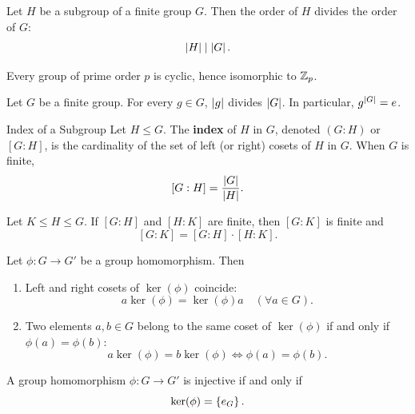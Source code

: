 \documentclass[12pt,a4paper]{article}
\begin{document}
    \begin{thm}
        Let $H$ be a subgroup of a finite group $G$. Then the order of $H$ divides the order of $G$:
        \[
            \left\lvert H \right\rvert \mid \left\lvert G \right\rvert.
        \]
    \end{thm}
    
    \begin{cor}\label{0.3.5}
        Every group of prime order $p$ is cyclic, hence isomorphic to $\mathbb{Z}_p$.
    \end{cor}
    \bigskip

    \begin{thm}
        Let $G$ be a finite group. For every $g \in G$, $\left\lvert g \right\rvert$ divides $\left\lvert G \right\rvert$. In particular, $g^{\left\lvert G \right\rvert} = e$.
    \end{thm}
    \bigskip

    \begin{defi}{Index of a Subgroup}
        Let $H \le G$. The \textbf{index} of $H$ in $G$, denoted $(G : H)$ or $[G : H]$, is the cardinality of the set of left (or right) cosets of $H$ in $G$. When $G$ is finite,
        \[
            [G : H] = \frac{\left\lvert G \right\rvert}{\left\lvert H \right\rvert}.
        \]
    \end{defi}
    \bigskip

    \begin{thm}
        Let $K \le H \le G$. If $[G : H]$ and $[H : K]$ are finite, then $[G : K]$ is finite and
        \[
            [G : K] = [G : H] \cdot [H : K].
        \]
    \end{thm}
    \bigskip

    \begin{thm}
        Let $\phi \colon G \to G'$ be a group homomorphism. Then
        \begin{enumerate}
            \item Left and right cosets of $\ker(\phi)$ coincide:
            \[
                a \ker(\phi) = \ker(\phi) a \quad (\forall a \in G).
            \]
            \item Two elements $a, b \in G$ belong to the same coset of $\ker(\phi)$ if and only if $\phi(a) = \phi(b)$:
            \[
                a \ker(\phi) = b \ker(\phi) \iff \phi(a) = \phi(b).
            \]
        \end{enumerate}
    \end{thm}
    \bigskip

    \begin{cor}
        A group homomorphism $\phi \colon G \to G'$ is injective if and only if
        \[
            \ker(\phi) = \left\{ e_G \right\}.
        \]
    \end{cor}
    \bigskip
\end{document}
